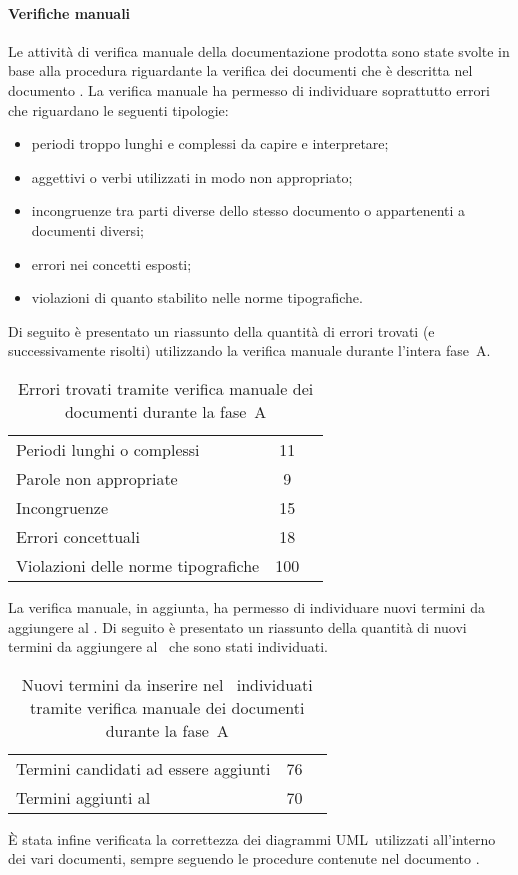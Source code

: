 \documentclass[../PianoDiQualifica.tex]{subfiles}
\begin{document}
\begin{appendices}
			\paragraph{Verifiche manuali}
			Le attività di verifica manuale della documentazione prodotta sono state svolte in base alla procedura riguardante la verifica dei documenti che è descritta nel documento \normediprogettov. La verifica manuale ha permesso di individuare soprattutto errori che riguardano le seguenti tipologie:
			\begin{itemize}
				\item periodi troppo lunghi e complessi da capire e interpretare;
				\item aggettivi o verbi utilizzati in modo non appropriato;
				\item incongruenze tra parti diverse dello stesso documento o appartenenti a documenti diversi;
				\item errori nei concetti esposti;
				\item violazioni di quanto stabilito nelle norme tipografiche.
			\end{itemize}
			Di seguito è presentato un riassunto della quantità di errori trovati (e successivamente risolti) utilizzando la verifica manuale durante l'intera fase\g\ A.
\begin{table}[H]
		\centering
		\begin{tabular}{l * {2}{c}}
			\midrule
			Periodi lunghi o complessi &	11 \\
			Parole non appropriate & 9 \\
			Incongruenze & 15 \\
			Errori concettuali & 18 \\
			Violazioni delle norme tipografiche & 100 \\
			\midrule
		\end{tabular}
		\caption{Errori trovati tramite verifica manuale dei documenti durante la fase\g\ A}
		\label{tab:errori_manuale}
\end{table}
			La verifica manuale, in aggiunta, ha permesso di individuare nuovi termini da aggiungere al \glossario. Di seguito è presentato un riassunto della quantità di nuovi termini da aggiungere al \glossario\ che sono stati individuati.
\begin{table}[H]
		\centering
		\begin{tabular}{l * {2}{c}}
			\midrule
			Termini candidati ad essere aggiunti &	76 \\
			Termini aggiunti al \glossario & 70 \\
			\midrule
		\end{tabular}
		\caption{Nuovi termini da inserire nel \glossario\ individuati tramite verifica manuale dei documenti durante la fase\g\ A}
		\label{tab:termini_glossario}
\end{table}	
			È stata infine verificata la correttezza dei diagrammi UML\g\ utilizzati all'interno dei vari documenti, sempre seguendo le procedure contenute nel documento \normediprogettov.

\end{appendices}
\end{document}
